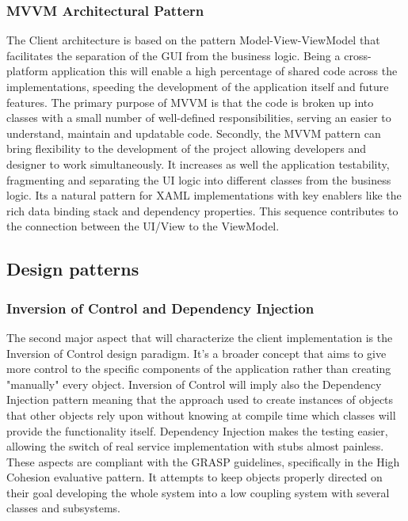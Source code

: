 \subsubsection*{MVVM Architectural Pattern}
The Client architecture is based on the pattern Model-View-ViewModel that facilitates the separation of the GUI from the business logic. Being a cross-platform application this will enable a high percentage of shared code across the implementations, speeding the development of the application itself and future features. The primary purpose of MVVM is that the code is broken up into classes with a small number of well-defined responsibilities, serving an easier to understand, maintain and updatable code. Secondly, the MVVM pattern can bring flexibility to the development of the project allowing developers and designer to work simultaneously. It increases as well the application testability, fragmenting and separating the UI logic into different classes from the business logic.
Its a natural pattern for XAML implementations with key enablers like the rich data binding stack and dependency properties. 
This sequence contributes to the connection between the UI/View to the ViewModel.

\subsection*{Design patterns}
\subsubsection*{Inversion of Control and Dependency Injection}

The second major aspect that will characterize the client implementation is the Inversion of Control design paradigm. 
It's a broader concept that aims to give more control to the specific components of the application rather than creating "manually" every object.
Inversion of Control will imply also the Dependency Injection pattern meaning that the approach used to create instances of objects that other objects rely upon without knowing at compile time which classes will provide the functionality itself.
Dependency Injection makes the testing easier, allowing the switch of real service implementation with stubs almost painless.
These aspects are compliant with the GRASP guidelines, specifically in the High Cohesion evaluative pattern.
It attempts to keep objects properly directed on their goal developing the whole system into a low coupling system with several classes and subsystems.

